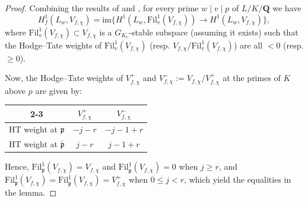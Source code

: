 \documentclass[10pt,letterpaper]{amsart}
\theoremstyle{plain}
\theoremstyle{definition}
\theoremstyle{definition}
\theoremstyle{plain}
\theoremstyle{plain}
\theoremstyle{plain}
\theoremstyle{remark}
\numberwithin{equation}{section}
\newcommand{\pp}{\mathfrak{p}}
\newcommand{\ppbar}{\bar{\mathfrak{p}}}
\newcommand{\Q}{\mathbf{Q}}
\begin{document}
\begin{proof}
Combining the results of \cite[(3.1)-(3.2)]{nekovarCRM} and \cite[Lem.\,2, p.\,125]{flach-CT}, for every prime $w\mid v\mid p$ of $L/K/\Q$  we have 
\[
H^1_f(L_w,V_{f,\chi})={\mathrm{im}}\bigl\{H^1(L_w,{\mathrm{Fil}}_v^1(V_{f,\chi}))\rightarrow H^1(L_w,V_{f,\chi})\bigr\},
\]
where ${\mathrm{Fil}}_v^1(V_{f,\chi})\subset V_{f,\chi}$  is a $G_{K_v}$-stable subspace (assuming it exists) such that the Hodge--Tate weights of ${\mathrm{Fil}}_v^1(V_{f,\chi})$ (resp. $V_{f,\chi}/{\mathrm{Fil}}_v^1(V_{f,\chi})$) are all $<0$  (resp. $\geq 0$).

Now, the Hodge--Tate weights of $V_{f,\chi}^+$ %
and $V_{f,\chi}^-:=V_{f,\chi}/V_{f,\chi}^{+}$ at the primes of $K$ above $p$ are given by:
\begin{center}
\begin{tabular}{c|c|c|}
\cline{2-3}
  & $V_{f,\chi}^+$ & $V_{f,\chi}^-$ \\
 \hline
\multicolumn{1}{|c|}{HT weight at $\pp$} & $-j-r$ & $-j-1+r$  \\
 \hline
 \multicolumn{1}{|c|}{HT weight at $\ppbar$} & $j-r$ & $j-1+r$  \\
 \hline
\end{tabular}
\end{center}
Hence, ${\mathrm{Fil}}_\pp^1(V_{f,\chi})=V_{f,\chi}$ and ${\mathrm{Fil}}_{\ppbar}^1(V_{f,\chi})=0$ when $j\geq r$, and ${\mathrm{Fil}}_\pp^1(V_{f,\chi})={\mathrm{Fil}}_{\ppbar}^1(V_{f,\chi})=V_{f,\chi}^+$ when $0\leq j<r$, which yield the equalities in the lemma.
\end{proof}
\end{document}
